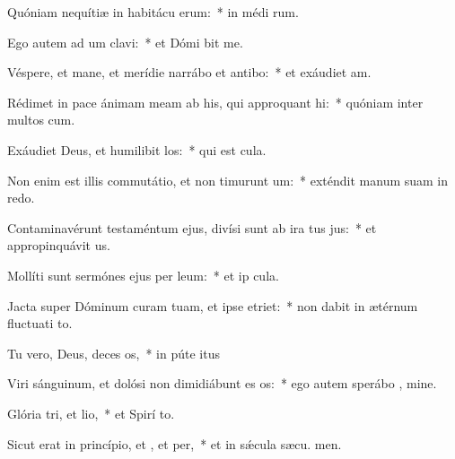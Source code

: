 \item Quóniam nequítiæ in habitácu erum:~* in médi rum.
\item Ego autem ad um clavi:~* et Dómi bit me.
\item Véspere, et mane, et merídie narrábo et antibo:~* et exáudiet  am.
\item Rédimet in pace ánimam meam ab his, qui approquant hi:~* quóniam inter multos  cum.
\item Exáudiet Deus, et humilibit los:~* qui est  cula.
\item Non enim est illis commutátio, et non timurunt um:~* exténdit manum suam in redo.
\item Contaminavérunt testaméntum ejus, divísi sunt ab ira tus jus:~* et appropinquávit  us.
\item Mollíti sunt sermónes ejus per leum:~* et ip  cula.
\item Jacta super Dóminum curam tuam, et ipse  etriet:~* non dabit in ætérnum fluctuati to.
\item Tu vero, Deus, deces os,~* in púte itus
\item Viri sánguinum, et dolósi non dimidiábunt es os:~* ego autem sperábo  , mine.
\item Glória tri, et lio,~* et Spirí to.
\item Sicut erat in princípio, et , et per,~* et in sǽcula sæcu. men.
